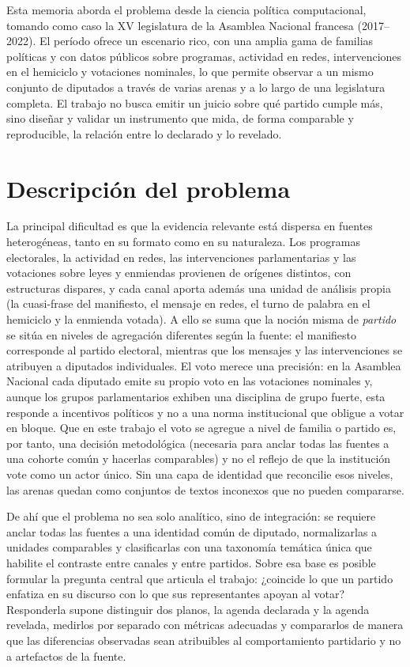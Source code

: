 Esta memoria aborda el problema desde la ciencia política computacional, tomando
como caso la XV legislatura de la Asamblea Nacional francesa (2017--2022). El
período ofrece un escenario rico, con una amplia gama de familias políticas y
con datos públicos sobre programas, actividad en redes, intervenciones en el
hemiciclo y votaciones nominales, lo que permite observar a un mismo conjunto de
diputados a través de varias arenas y a lo largo de una legislatura completa. El
trabajo no busca emitir un juicio sobre qué partido cumple más, sino diseñar y
validar un instrumento que mida, de forma comparable y reproducible, la relación
entre lo declarado y lo revelado.

\section{Descripción del problema}
\label{sec:problema}

La principal dificultad es que la evidencia relevante está dispersa en fuentes
heterogéneas, tanto en su formato como en su naturaleza. Los programas
electorales, la actividad en redes, las intervenciones parlamentarias y las
votaciones sobre leyes y enmiendas provienen de orígenes distintos, con
estructuras dispares, y cada canal aporta además una unidad de análisis propia
(la cuasi-frase del manifiesto, el mensaje en redes, el turno de palabra en el
hemiciclo y la enmienda votada). A ello se suma que la noción misma de
\emph{partido} se sitúa en niveles de agregación diferentes según la fuente: el
manifiesto corresponde al partido electoral, mientras que los mensajes y las
intervenciones se atribuyen a diputados individuales. El voto merece una
precisión: en la Asamblea Nacional cada diputado emite su propio voto en las
votaciones nominales y, aunque los grupos parlamentarios exhiben una disciplina de
grupo fuerte, esta responde a incentivos políticos y no a una norma institucional
que obligue a votar en bloque. Que en este trabajo el voto se agregue a nivel de
familia o partido es, por tanto, una decisión metodológica (necesaria para anclar
todas las fuentes a una cohorte común y hacerlas comparables) y no el reflejo de
que la institución vote como un actor único. Sin una capa de identidad que
reconcilie esos niveles, las arenas quedan como conjuntos de textos inconexos que
no pueden compararse.

De ahí que el problema no sea solo analítico, sino de integración: se requiere
anclar todas las fuentes a una identidad común de diputado, normalizarlas a
unidades comparables y clasificarlas con una taxonomía temática única que
habilite el contraste entre canales y entre partidos. Sobre esa base es posible
formular la pregunta central que articula el trabajo: ¿coincide lo que un partido
enfatiza en su discurso con lo que sus representantes apoyan al votar? Responderla
supone distinguir dos planos, la agenda declarada y la agenda revelada, medirlos
por separado con métricas adecuadas y compararlos de manera que las diferencias
observadas sean atribuibles al comportamiento partidario y no a artefactos de la
fuente.

